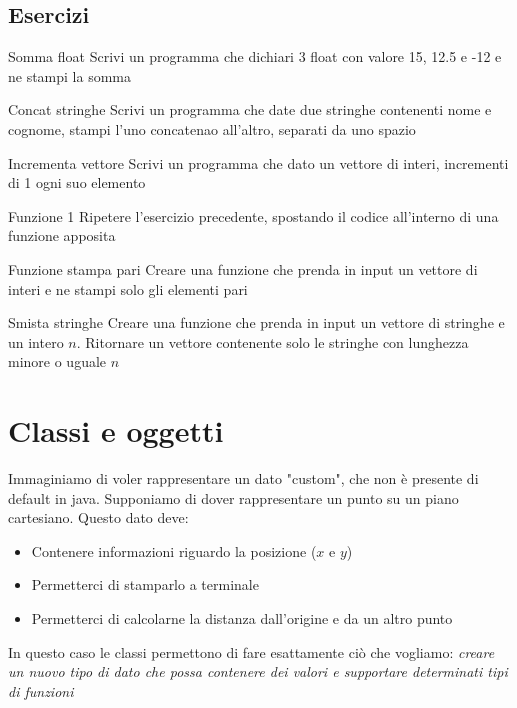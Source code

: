 \subsection{Esercizi}
\begin{esercizio}{Somma float}
	Scrivi un programma che dichiari 3 float con valore 15, 12.5 e -12 e ne stampi la somma
\end{esercizio}
\begin{esercizio}{Concat stringhe}
	Scrivi un programma che date due stringhe contenenti nome e cognome, stampi l'uno concatenao all'altro, separati da uno spazio
\end{esercizio}
\begin{esercizio}{Incrementa vettore}
	Scrivi un programma che dato un vettore di interi, incrementi di 1 ogni suo elemento
\end{esercizio}
\begin{esercizio}{Funzione 1}
	Ripetere l'esercizio precedente, spostando il codice all'interno di una funzione apposita
\end{esercizio}
\begin{esercizio}{Funzione stampa pari}
	Creare una funzione che prenda in input un vettore di interi e ne stampi solo gli elementi pari
\end{esercizio}
\begin{esercizio}{Smista stringhe}
	Creare una funzione che prenda in input un vettore di stringhe e un intero $ n $. Ritornare un vettore contenente solo le stringhe con lunghezza minore o uguale $ n $
\end{esercizio}

\section{Classi e oggetti}
Immaginiamo di voler rappresentare un dato "custom", che non è presente di default in java. Supponiamo di dover rappresentare un punto su un piano cartesiano. Questo dato deve:
\begin{itemize}
	\item Contenere informazioni riguardo la posizione ($ x $ e $ y $)
	\item Permetterci di stamparlo a terminale
	\item Permetterci di calcolarne la distanza dall'origine e da un altro punto
\end{itemize}
In questo caso le classi permettono di fare esattamente ciò che vogliamo: \textit{creare un nuovo tipo di dato che possa contenere dei valori e supportare determinati tipi di funzioni}

